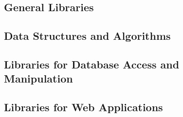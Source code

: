 {\subsection{General Libraries}












































\subsection{Data Structures and Algorithms}
















\subsection{Libraries for Database Access and Manipulation}










\subsection{Libraries for Web Applications}





} %


